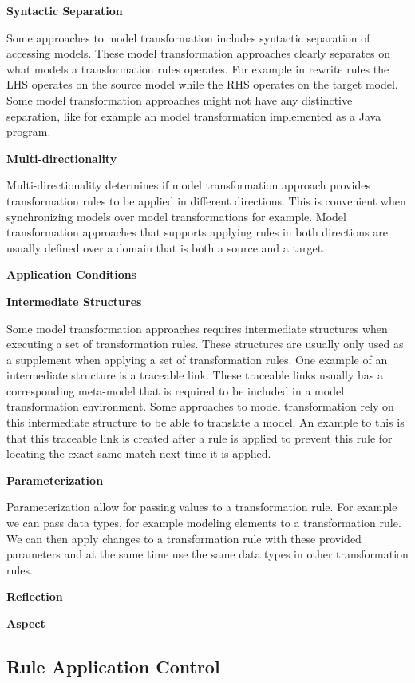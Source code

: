 \textbf{Syntactic Separation}

Some approaches to model transformation includes syntactic separation of
accessing models. These model transformation approaches clearly separates on
what models a transformation rules operates. For example in rewrite rules the
LHS operates on the source model while the RHS operates on the target model.
Some model transformation approaches might not have any distinctive separation,
like for example an model transformation implemented as a Java program. 

\textbf{Multi-directionality}

Multi-directionality determines if model transformation approach provides
transformation rules to be applied in different directions. This is convenient
when synchronizing models over model transformations for example. Model
transformation approaches that supports applying rules in both directions are
usually defined over a domain that is both a source and a target.


\textbf{Application Conditions}

\textbf{Intermediate Structures}

Some model transformation approaches requires intermediate structures when
executing a set of transformation rules. These structures are usually only
used as a supplement when applying a set of transformation rules. One
example of an intermediate structure is a traceable link. These traceable links
usually has a corresponding meta-model that is required to be included in a
model transformation environment. Some approaches to model transformation rely
on this intermediate structure to be able to translate a model. An example to
this is that this traceable link is created after a rule is applied to prevent
this rule for locating the exact same match next time it is applied. 

\textbf{Parameterization}

Parameterization allow for passing values to a transformation rule. For example
we can pass data types, for example modeling elements to a transformation rule.
We can then apply changes to a transformation rule with these provided
parameters and at the same time use the same data types in other
transformation rules.

\textbf{Reflection}

\textbf{Aspect}



\subsection{Rule Application Control}

